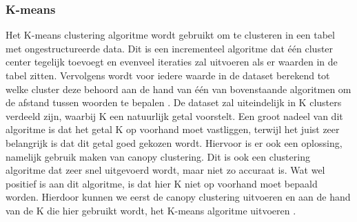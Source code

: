 \subsubsection{K-means}
Het K-means clustering algoritme wordt gebruikt om te clusteren in een tabel met ongestructureerde data. Dit is een incrementeel algoritme dat één cluster center tegelijk toevoegt en evenveel iteraties zal uitvoeren als er waarden in de tabel zitten. Vervolgens wordt voor iedere waarde in de dataset berekend tot welke cluster deze behoord aan de hand van één van bovenstaande algoritmen om de afstand tussen woorden te bepalen \autocite{Likas2003}. De dataset zal uiteindelijk in K clusters verdeeld zijn, waarbij K een natuurlijk getal voorstelt. Een groot nadeel van dit algoritme is dat het getal K op voorhand moet vastliggen, terwijl het juist zeer belangrijk is dat dit getal goed gekozen wordt. Hiervoor is er ook een oplossing, namelijk gebruik maken van canopy clustering. Dit is ook een clustering algoritme dat zeer snel uitgevoerd wordt, maar niet zo accuraat is. Wat wel positief is aan dit algoritme, is dat hier K niet op voorhand moet bepaald worden. Hierdoor kunnen we eerst de canopy clustering uitvoeren en aan de hand van de K die hier gebruikt wordt, het K-means algoritme uitvoeren \autocite{Vandenbussche2016}.






%

